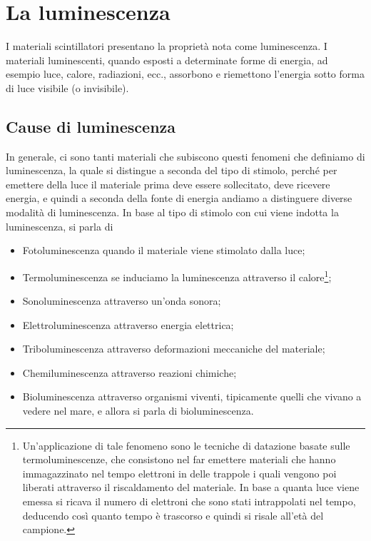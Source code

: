 \section{La luminescenza}

I materiali scintillatori presentano la proprietà nota come luminescenza. I materiali luminescenti, quando esposti a determinate forme di energia, ad esempio luce, calore, radiazioni, ecc., assorbono e riemettono l'energia sotto forma di luce visibile (o invisibile).

\subsection{Cause di luminescenza}

In generale, ci sono tanti materiali che subiscono questi fenomeni che definiamo di luminescenza, la quale si distingue a seconda del tipo di stimolo, perché per emettere della luce il materiale prima deve essere sollecitato, deve ricevere energia, e quindi a seconda della fonte di energia andiamo a distinguere diverse modalità di luminescenza. In base al tipo di stimolo con cui viene indotta la luminescenza, si parla di

\begin{itemize}[leftmargin=0.5cm]
   \item Fotoluminescenza quando il materiale viene stimolato dalla luce;
   \item Termoluminescenza se induciamo la luminescenza attraverso il calore\footnote{Un'applicazione di tale fenomeno sono le tecniche di datazione basate sulle termoluminescenze, che consistono nel far emettere materiali che hanno immagazzinato nel tempo elettroni in delle trappole i quali vengono poi liberati attraverso il riscaldamento del materiale. In base a quanta luce viene emessa si ricava il numero di elettroni che sono stati intrappolati nel tempo, deducendo così quanto tempo è trascorso e quindi si risale all'età del campione.};
   \item Sonoluminescenza attraverso un'onda sonora;
   \item Elettroluminescenza attraverso energia elettrica;
   \item Triboluminescenza attraverso deformazioni meccaniche del materiale;
   \item Chemiluminescenza attraverso reazioni chimiche;
   \item Bioluminescenza attraverso organismi viventi, tipicamente quelli che vivano a vedere nel mare, e allora si parla di bioluminescenza.
\end{itemize}


